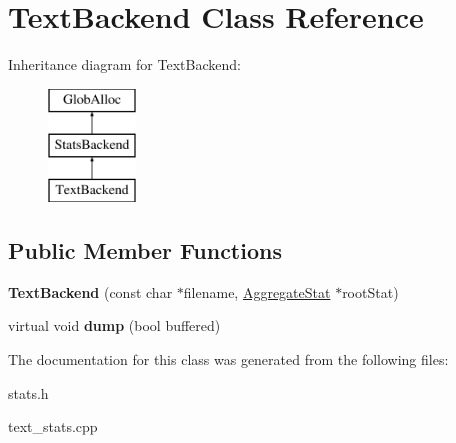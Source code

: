 \hypertarget{classTextBackend}{\section{Text\-Backend Class Reference}
\label{classTextBackend}
}
Inheritance diagram for Text\-Backend\-:\begin{figure}[H]
\begin{center}
\leavevmode
\includegraphics[height=3.000000cm]{classTextBackend}
\end{center}
\end{figure}
\subsection*{Public Member Functions}
\begin{DoxyCompactItemize}
\item 
\hypertarget{classTextBackend_ab3abc99bf4cf0bb76afdbc2fe62a08a0}{{\bfseries Text\-Backend} (const char $\ast$filename, \hyperlink{classAggregateStat}{Aggregate\-Stat} $\ast$root\-Stat)}\label{classTextBackend_ab3abc99bf4cf0bb76afdbc2fe62a08a0}

\item 
\hypertarget{classTextBackend_adade502fcdfdbbe77a3c7da81483e024}{virtual void {\bfseries dump} (bool buffered)}\label{classTextBackend_adade502fcdfdbbe77a3c7da81483e024}

\end{DoxyCompactItemize}


The documentation for this class was generated from the following files\-:\begin{DoxyCompactItemize}
\item 
stats.\-h\item 
text\-\_\-stats.\-cpp\end{DoxyCompactItemize}
